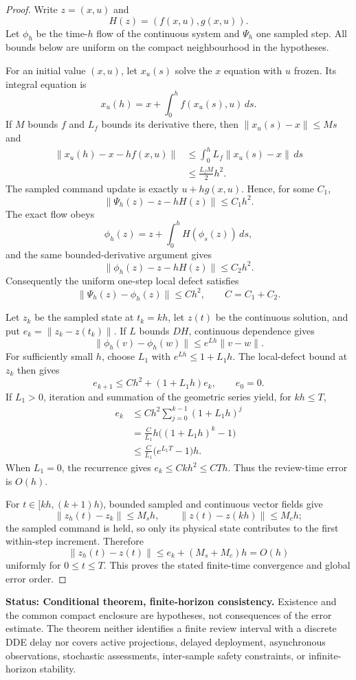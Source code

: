 \documentclass[11pt]{article}
\theoremstyle{definition}
\newcommand{\status}[1]{\par\smallskip\noindent\textbf{Status: #1.}\quad}
\begin{document}
\begin{proof}
Write $z=(x,u)$ and
\[
H(z)=(f(x,u),g(x,u)).
\]
Let $\phi_h$ be the time-$h$ flow of the continuous system and $\Psi_h$ one sampled step. All bounds below are uniform on the compact neighbourhood in the hypotheses.

For an initial value $(x,u)$, let $x_u(s)$ solve the $x$ equation with $u$ frozen. Its integral equation is
\[
x_u(h)=x+\int_0^h f(x_u(s),u)\,ds.
\]
If $M$ bounds $f$ and $L_f$ bounds its derivative there, then $\|x_u(s)-x\|\le Ms$ and
\begin{align*}
\|x_u(h)-x-hf(x,u)\|
&\le\int_0^hL_f\|x_u(s)-x\|\,ds\\
&\le\frac{L_fM}{2}h^2.
\end{align*}
The sampled command update is exactly $u+hg(x,u)$. Hence, for some $C_1$,
\[
\|\Psi_h(z)-z-hH(z)\|\le C_1h^2.
\]
The exact flow obeys
\[
\phi_h(z)=z+\int_0^hH(\phi_s(z))\,ds,
\]
and the same bounded-derivative argument gives
\[
\|\phi_h(z)-z-hH(z)\|\le C_2h^2.
\]
Consequently the uniform one-step local defect satisfies
\[
\|\Psi_h(z)-\phi_h(z)\|\le Ch^2,
\qquad C=C_1+C_2.
\]

Let $z_k$ be the sampled state at $t_k=kh$, let $z(t)$ be the continuous solution, and put $e_k=\|z_k-z(t_k)\|$. If $L$ bounds $DH$, continuous dependence gives
\[
\|\phi_h(v)-\phi_h(w)\|\le e^{Lh}\|v-w\|.
\]
For sufficiently small $h$, choose $L_1$ with $e^{Lh}\le1+L_1h$. The local-defect bound at $z_k$ then gives
\[
e_{k+1}
\le Ch^2+(1+L_1h)e_k,
\qquad e_0=0.
\]
If $L_1>0$, iteration and summation of the geometric series yield, for $kh\le T$,
\begin{align*}
e_k
&\le Ch^2\sum_{j=0}^{k-1}(1+L_1h)^j\\
&=\frac{C}{L_1}h\bigl((1+L_1h)^k-1\bigr)\\
&\le\frac{C}{L_1}\bigl(e^{L_1T}-1\bigr)h.
\end{align*}
When $L_1=0$, the recurrence gives $e_k\le Ckh^2\le CTh$. Thus the review-time error is $O(h)$.

For $t\in[kh,(k+1)h)$, bounded sampled and continuous vector fields give
\[
\|z_h(t)-z_k\|\le M_sh,
\qquad
\|z(t)-z(kh)\|\le M_ch;
\]
the sampled command is held, so only its physical state contributes to the first within-step increment. Therefore
\[
\|z_h(t)-z(t)\|
\le e_k+(M_s+M_c)h=O(h)
\]
uniformly for $0\le t\le T$. This proves the stated finite-time convergence and global error order.
\end{proof}

\status{Conditional theorem, finite-horizon consistency} Existence and the common compact enclosure are hypotheses, not consequences of the error estimate. The theorem neither identifies a finite review interval with a discrete DDE delay nor covers active projections, delayed deployment, asynchronous observations, stochastic assessments, inter-sample safety constraints, or infinite-horizon stability.
\end{document}
